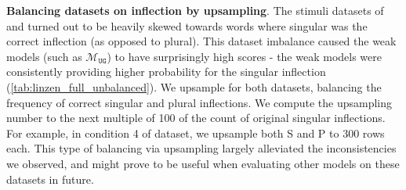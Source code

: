 \documentclass[letterpaper, 12pt]{report}
\newcommand{\xhdr}[1]{{\noindent\bfseries #1}.}
\newcommand{\RC}{$\mathcal{M}_{\texttt{UG}}$}
\begin{document}
\begin{figure}[]
    \centering
    \caption{\citet{linzen-etal-2016-assessing}}
    \label{fig:mlm_linzen_diff}
\end{figure}


\begin{figure}[h]
    \centering
    \caption{\citet{gulordava2018}}
    \label{fig:mlm_gul_diff}
\end{figure}

\xhdr{Balancing datasets on inflection by upsampling}
The stimuli datasets of \citet{linzen-etal-2016-assessing} and \citet{gulordava2018} turned out to be heavily skewed towards words where singular was the correct inflection (as opposed to plural). This dataset imbalance caused the weak models (such as \RC) to have surprisingly high scores - the weak models were consistently providing higher probability for the singular inflection (\autoref{tab:linzen_full_unbalanced}). We upsample for both datasets, balancing the frequency of correct singular and plural inflections. We compute the upsampling number to the next multiple of 100 of the count of original singular inflections. For example, in condition 4 of \citet{linzen-etal-2016-assessing} dataset, we upsample both S and P to 300 rows each. This type of balancing via upsampling largely alleviated the inconsistencies we observed, and might prove to be useful when evaluating other models on these datasets in future.
\end{document}
